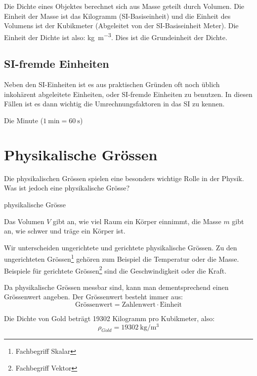 \begin{example}
Die Dichte eines Objektes berechnet sich aus Masse geteilt durch Volumen. Die Einheit der Masse ist das Kilogramm (SI-Basiseinheit) und die Einheit des Volumens ist der Kubikmeter (Abgeleitet von der SI-Basiseinheit Meter). Die Einheit der Dichte ist also: \si{\kilogram \per \metre \cubed}. Dies ist die Grundeinheit der Dichte.
\end{example}
\subsection{SI-fremde Einheiten}
Neben den SI-Einheiten ist es aus praktischen Gründen oft noch üblich inkohärent abgeleitete Einheiten, oder SI-fremde Einheiten zu benutzen. In diesen Fällen ist es dann wichtig die Umrechnungsfaktoren in das SI zu kennen. 
\begin{example}
Die Minute ($\SI{1}{\minute} = \SI{60}{\second}$)
\end{example}


\section{Physikalische Grössen}
Die physikalischen Grössen spielen eine besonders wichtige Rolle in der Physik. Was ist jedoch eine physikalische Grösse? 

\begin{definition} %
physikalische Grösse
    \vspace{2cm}
\end{definition}
\begin{example}
Das Volumen $V$ gibt an, wie viel Raum ein Körper einnimmt, die Masse $m$ gibt an, wie schwer und träge ein Körper ist.
\end{example}
Wir unterscheiden ungerichtete und gerichtete physikalische Grössen. Zu den ungerichteten Grössen\footnote{Fachbegriff Skalar} gehören zum Beispiel die Temperatur oder die Masse. Beispiele für gerichtete Grössen\footnote{Fachbegriff Vektor} sind die Geschwindigkeit oder die Kraft.

Da physikalische Grössen messbar sind, kann man dementsprechend einen Grössenwert angeben. Der Grössenwert besteht immer aus:
\[ \text{Grössenwert} = \text{Zahlenwert} \cdot \text{Einheit} \]
\begin{example}
Die Dichte von Gold beträgt 19302 Kilogramm pro Kubikmeter, also:
\[ \rho_{Gold} = \SI{19302}{\kilo \gram \per \metre \cubed} \]
\end{example}

